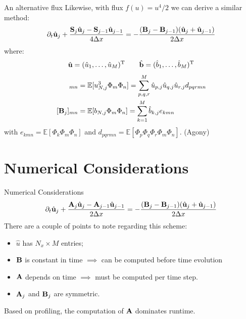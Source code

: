 \documentclass[
    pdf,
    11pt,
    xcolor={svgnames},
  ]{beamer}
\begin{document}
\begin{frame}{An alternative flux}
    Likewise, with flux $f(u) = u^4 / 2$ we can derive a similar method:
   \begin{equation}
       \partial_t \hat{\vb{u}}_j + \frac{\vb{S}_j \hat{\vb{u}}_j - \vb{S}_{j-1} \hat{\vb{u}}_{j-1}}{4\Delta x} = -\frac{(\vb{B}_j - \vb{B}_{j-1})(\hat{\vb{u}}_j + \hat{\vb{u}}_{j-1})}{2\Delta x}
   \end{equation} 
   where:
   \begin{equation*}
       \hat{\vb{u}} = (\hat{u}_1, \dots, \hat{u}_M)^\mathrm{T}
       \qquad
       \hat{\vb{b}} = (\hat{b}_1, \dots, \hat{b}_M)^\mathrm{T}
   \end{equation*}
   \begin{align*}
       [\vb{S}_j]_{mn} &= \mathbb{E}[u_{N,j}^3 \Phi_m \Phi_n]  = \sum_{p,q,r}^M \hat{u}_{p,j} \hat{u}_{q,j} \hat{u}_{r,j} d_{pqrmn}\\
       [\vb{B}_j]_{mn} &= \mathbb{E}[b_{N,j} \Phi_m \Phi_n] = \sum_{k=1}^M \hat{b}_{k,j} e_{kmn}
   \end{align*}
   with $e_{kmn} = \mathbb{E}[\Phi_k \Phi_m \Phi_n]$ and $d_{pqrmn} = \mathbb{E}[\Phi_p \Phi_q \Phi_r \Phi_m \Phi_n]$. (Agony)
\end{frame}

\section{Numerical Considerations}
\begin{frame}{Numerical Considerations}
   \begin{equation*}
       \partial_t \hat{\vb{u}}_j + \frac{\vb{A}_j \hat{\vb{u}}_j - \vb{A}_{j-1} \hat{\vb{u}}_{j-1}}{2\Delta x} = -\frac{(\vb{B}_j - \vb{B}_{j-1})(\hat{\vb{u}}_j + \hat{\vb{u}}_{j-1})}{2\Delta x}
   \end{equation*} 
   There are a couple of points to note regarding this scheme:
   \begin{itemize}[<+->]
       \item $\hat{u}$ has $N_x \times M$ entries;
       \item $\vb{B}$ is constant in time $\implies$ can be computed before time evolution
       \item $\vb{A}$ depends on time $\implies$ must be computed per time step.
       \item $\vb{A}_j$ and $\vb{B}_j$ are symmetric.
   \end{itemize}
   Based on profiling, the computation of $\vb{A}$ dominates runtime.
\end{frame}
\end{document}
